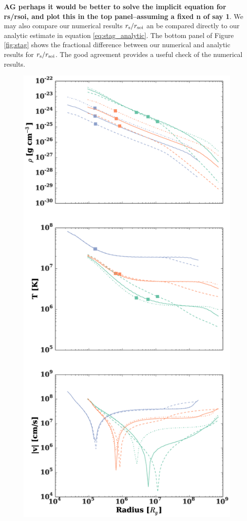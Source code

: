 \documentclass[usenatbib,fleqn]{mn2e}
\begin{document}
{\bf AG perhaps it would be better to solve the implicit equation for
  rs/rsoi, and plot this in the top panel--assuming a fixed n of say
  1}. We may also compare our numerical results $r_{\rm s}/r_{\rm
  soi}$ an be compared directly to our analytic estimate in equation
\ref{eq:stag_analytic}.  The bottom panel of Figure \ref{fig:stag}
shows the fractional difference between our numerical and analytic
results for $r_{\rm s}/r_{\rm soi}$.  The good agreement provides a
useful check of the numerical results.


\begin{figure}
  \includegraphics[width=\columnwidth]{profiles.eps}

\end{figure}
\end{document}
